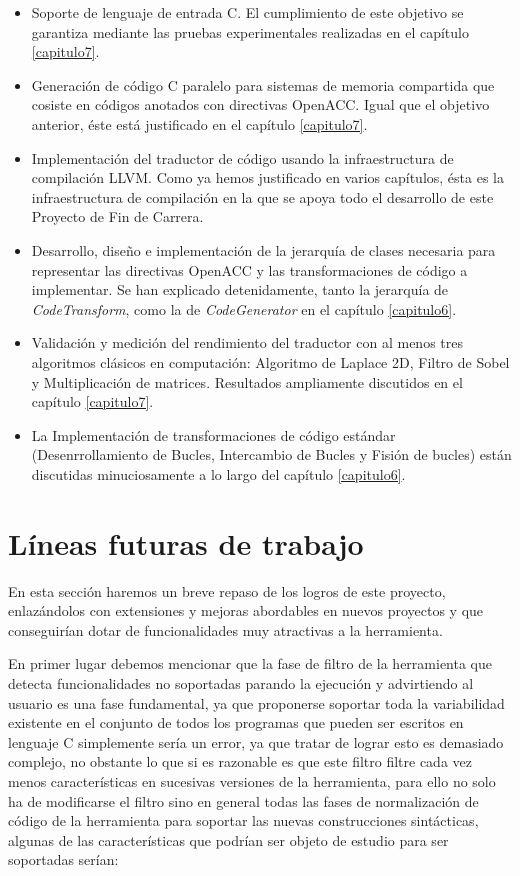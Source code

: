 \begin{itemize}
\item Soporte de lenguaje de entrada C. El cumplimiento de este objetivo se garantiza mediante las pruebas experimentales realizadas en el capítulo \ref{capitulo7}.
\item Generación de código C paralelo para sistemas de memoria compartida que cosiste en códigos anotados con directivas OpenACC. Igual que el objetivo anterior, éste está justificado en el capítulo \ref{capitulo7}.
\item Implementación del traductor de código usando la infraestructura de compilación LLVM. Como ya hemos justificado en varios capítulos, ésta es la infraestructura de compilación en la que se apoya todo el desarrollo de este Proyecto de Fin de Carrera.
\item Desarrollo, diseño e implementación de la jerarquía de clases necesaria para representar las directivas OpenACC y las transformaciones de código a implementar. Se han explicado detenidamente, tanto la jerarquía de \textit{CodeTransform}, como la de \textit{CodeGenerator} en el capítulo \ref{capitulo6}.
\item Validación y medición del rendimiento del traductor con al menos tres algoritmos clásicos en computación: Algoritmo de Laplace 2D, Filtro de Sobel y Multiplicación de matrices. Resultados ampliamente discutidos en el capítulo \ref{capitulo7}. 
\item La Implementación de transformaciones de código estándar (Desenrrollamiento de Bucles, Intercambio de Bucles y Fisión de bucles) están discutidas minuciosamente a lo largo del capítulo \ref{capitulo6}. 
\end{itemize}


\section{Líneas futuras de trabajo}

En esta sección haremos un breve repaso de los logros de este proyecto, enlazándolos con extensiones y mejoras abordables en nuevos proyectos y que conseguirían dotar de funcionalidades muy atractivas a la herramienta.

En primer lugar debemos mencionar que la fase de filtro de la herramienta que detecta funcionalidades no soportadas parando la ejecución y advirtiendo al usuario es una fase fundamental, ya que proponerse soportar toda la variabilidad existente en el conjunto de todos los programas que pueden ser escritos en lenguaje C simplemente sería un error, ya que tratar de lograr esto es demasiado complejo, no obstante lo que si es razonable es que este filtro filtre cada vez menos características en sucesivas versiones de la herramienta, para ello no solo ha de modificarse el filtro sino en general todas las fases de normalización de código de la herramienta para soportar las nuevas construcciones sintácticas, algunas de las características que podrían ser objeto de estudio para ser soportadas serían:

